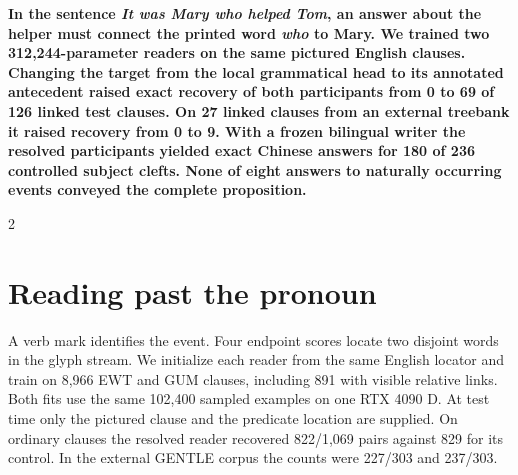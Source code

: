 \noindent\textbf{In the sentence \emph{It was Mary who helped Tom}, an answer about the helper must connect the printed word \emph{who} to Mary. We trained two 312,244-parameter readers on the same pictured English clauses. Changing the target from the local grammatical head to its annotated antecedent raised exact recovery of both participants from 0 to 69 of 126 linked test clauses. On 27 linked clauses from an external treebank it raised recovery from 0 to 9. With a frozen bilingual writer the resolved participants yielded exact Chinese answers for 180 of 236 controlled subject clefts. None of eight answers to naturally occurring events conveyed the complete proposition.}\par
\begin{multicols}{2}
\section*{Reading past the pronoun}
A verb mark identifies the event. Four endpoint scores locate two disjoint words in the glyph stream. We initialize each reader from the same English locator and train on 8,966 EWT and GUM clauses, including 891 with visible relative links. Both fits use the same 102,400 sampled examples on one RTX 4090 D. At test time only the pictured clause and the predicate location are supplied. On ordinary clauses the resolved reader recovered 822/1,069 pairs against 829 for its control. In the external GENTLE corpus the counts were 227/303 and 237/303.
\end{multicols}
